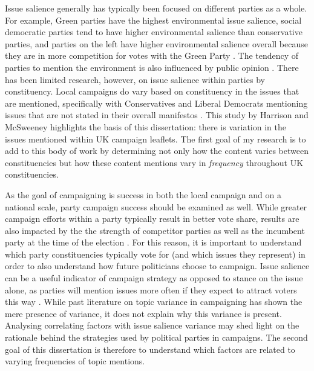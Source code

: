 \documentclass[preprint]{elsarticle} %
\begin{document}
Issue salience generally has typically been focused on different parties as a whole. For example, Green parties have the highest environmental issue salience, social democratic parties tend to have higher environmental salience than conservative parties, and parties on the left have higher environmental salience overall because they are in more competition for votes with the Green Party \citep{carterGreeningMainstreamParty2013}. The tendency of parties to mention the environment is also influenced by public opinion \citep{carterPartyPoliticizationEnvironment2006}. There has been limited research, however, on issue salience within parties by constituency. Local campaigns do vary based on constituency in the issues that are mentioned, specifically with Conservatives and Liberal Democrats mentioning issues that are not stated in their overall manifestos \citep{harrisonNationalLocalParty2008}. This study by Harrison and McSweeney highlights the basis of this dissertation: there is variation in the issues mentioned within UK campaign leaflets. The first goal of my research is to add to this body of work by determining not only how the content varies between constituencies but how these content mentions vary in \textit{frequency} throughout UK constituencies.


As the goal of campaigning is success in both the local campaign and on a national scale, party campaign success should be examined as well. While greater campaign efforts within a party typically result in better vote share, results are also impacted by the the strength of competitor parties as well as the incumbent party at the time of the election \citep{pattieIncumbentPartiesIncumbent2017a}. For this reason, it is important to understand which party constituencies typically vote for (and which issues they represent) in order to also understand how future politicians choose to campaign. Issue salience can be a useful indicator of campaign strategy as opposed to stance on the issue alone, as parties will mention issues more often if they expect to attract voters this way \citep{pogorelisIssueSalienceRegional2005}. While past literature on topic variance in campaigning has shown the mere presence of variance, it does not explain why this variance is present. Analysing correlating factors with issue salience variance may shed light on the rationale behind the strategies used by political parties in campaigns. The second goal of this dissertation is therefore to understand which factors are related to varying frequencies of topic mentions. 
\end{document}
